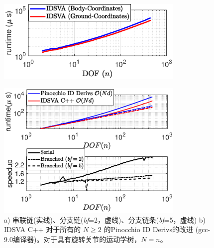 \documentclass[letterpaper, 10 pt, conference]{ieeetran}  %
\begin{document}
\begin{figure}[tb]
\hspace{-0.5cm}
\includegraphics[width=9cm]{IDSVA_bf_vs_gf.eps}
\caption{}
\label{idsva_bf_vs_gf}
\end{figure}


\begin{figure}[tb]
\includegraphics[width=9cm]{rneacr_vs_idsva_gcc_wo_march.eps}
\caption{a) 串联链(实线)、分支链(\textit{bf}=2，虚线)、分支链条(\textit{bf}=5，虚线) b) IDSVA C++ 对于所有的 $N \geq 2$ 的Pinocchio ID Derivs的改进 (gcc-9.0编译器)。对于具有旋转关节的运动学树，$N = n$。}
\label{SVA_vs_RNEA_FO_fig}
\end{figure}
\end{document}
